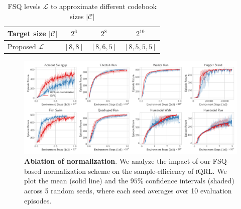 \documentclass{article}
\theoremstyle{plain}
\theoremstyle{definition}
\theoremstyle{remark}
\newcommand{\our}{\textsc{iQRL}\xspace}
\begin{document}
\begin{table}[t]
\caption{FSQ levels $\mathcal{L}$ to approximate different codebook sizes $|\mathcal{C}|$}
\label{tab:fsq-levels}
\vskip 0.15in
\begin{center}
\begin{small}
\begin{sc}
\begin{tabular}{lccc}
\toprule
Target size $|\mathcal{C}|$ & $2^{6}$ & $2^{8}$ & $2^{10}$ \\
\midrule
Proposed $\mathcal{L}$ & $[8,8]$ & $[8,6,5]$ & $[8,5,5,5]$ \\
\bottomrule
\end{tabular}
\end{sc}
\end{small}
\end{center}
\vskip -0.1in
\end{table}

\begin{figure}[ht]
\vskip 0.2in
\begin{center}
\centerline{\includegraphics[width=1.0\textwidth]{./figs/normalization-ablation.pdf}}
\caption{\textbf{Ablation of normalization}. We analyze the impact of our FSQ-based normalization scheme on the sample-efficiency of \our. We plot the mean (solid line) and the $95\%$ confidence intervals (shaded) across 5 random seeds, where each seed averages over 10 evaluation episodes.}
\label{fig:normalization-ablation}
\end{center}
\vskip -0.2in
\end{figure}
\end{document}
